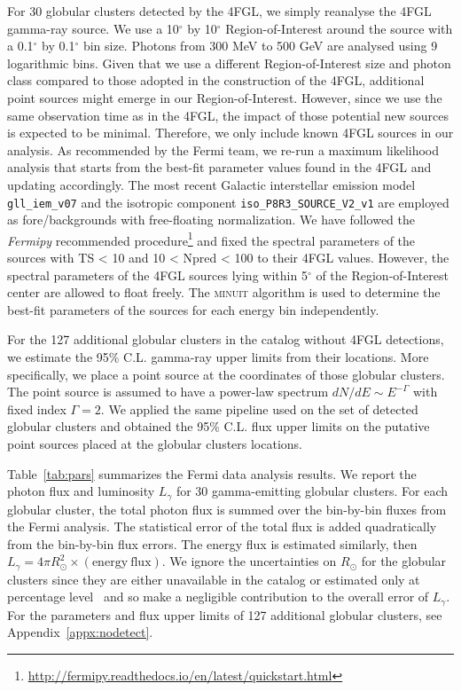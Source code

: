 \documentclass[doublespace,nopageskip]{VTthesis}
\begin{document}
For 30 globular clusters detected by the 4FGL, we simply reanalyse the 4FGL gamma-ray source. We use a 10$^{\circ}$ by 10$^{\circ}$ Region-of-Interest around the source with a 0.1$^{\circ}$ by 0.1$^{\circ}$ bin size. Photons from 300 MeV to 500 GeV are analysed using 9 logarithmic bins. Given that we use a different Region-of-Interest size and photon class compared to those adopted in the construction of the 4FGL, additional point sources might emerge in our Region-of-Interest. However, since we use the same observation time as in the 4FGL, the impact of those potential new sources is expected to be minimal. Therefore, we only include known 4FGL sources in our analysis. As recommended by the Fermi team, we re-run a maximum likelihood analysis that starts from the best-fit parameter values found in the 4FGL and updating accordingly. The most recent Galactic interstellar emission model \texttt{gll\_iem\_v07} and the isotropic component \texttt{iso\_P8R3\_SOURCE\_V2\_v1} are employed as fore/backgrounds with free-floating normalization. We have followed the \textit{Fermipy} recommended procedure\footnote{\url{http://fermipy.readthedocs.io/en/latest/quickstart.html}} and fixed the spectral parameters of the sources with TS < 10 and 10 < Npred < 100 to their 4FGL values. However, the spectral parameters of the 4FGL sources lying within 5$^{\circ}$ of the Region-of-Interest center are allowed to float freely. The \textsc{minuit} algorithm is used to determine the best-fit parameters of the sources for each energy bin independently.

For the 127 additional globular clusters in the \citet{1996AJ....112.1487H} catalog without 4FGL detections, we estimate the 95\% C.L. gamma-ray upper limits from their locations. More specifically, we place a point source at the coordinates of those globular clusters. The point source is assumed to have a power-law spectrum $dN/dE\sim E^{-\Gamma}$ with fixed index $\Gamma = 2$. We applied the same pipeline used on the set of detected globular clusters and obtained the 95\% C.L. flux upper limits on the putative point sources placed at the globular clusters locations.

Table~\ref{tab:pars} summarizes the Fermi data analysis results. We report the photon flux and luminosity $L_\gamma$ for 30 gamma-emitting globular clusters. For each globular cluster, the total photon flux is summed over the bin-by-bin fluxes from the Fermi analysis. The statistical error of the total flux is added quadratically from the bin-by-bin flux errors. The energy flux is estimated similarly, then $L_\gamma = 4\pi R_\odot^2 \times (\mathrm{energy\ flux})$. We ignore the uncertainties on $R_\odot$ for the globular clusters since they are either unavailable in the \citet{1996AJ....112.1487H} catalog or estimated only at percentage level~\citep{2017MNRAS.464.2174B} and so make a negligible contribution to the overall error of $L_\gamma$. For the parameters and flux upper limits of 127 additional globular clusters, see Appendix~\ref{appx:nodetect}.
\end{document}

